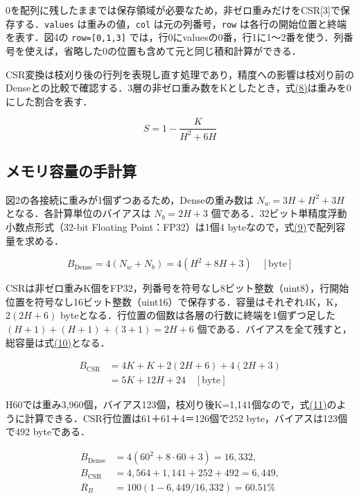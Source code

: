 \documentclass[
  10pt,
  a4paper,
]{article}
\begin{document}
0を配列に残したままでは保存領域が必要なため，非ゼロ重みだけをCSR{[}3{]}で保存する．\texttt{values}
は重みの値，\texttt{col} は元の列番号，\texttt{row}
は各行の開始位置と終端を表す．図4の \texttt{row={[}0,1,3{]}}
では，行0にvaluesの0番，行1に1〜2番を使う．列番号を使えば，省略した0の位置も含めて元と同じ積和計算ができる．

CSR変換は枝刈り後の行列を表現し直す処理であり，精度への影響は枝刈り前のDenseとの比較で確認する．3層の非ゼロ重み数をKとしたとき，式\hyperref[eq:sparsity]{(8)}は重みを0にした割合を表す．

\begin{equation}\label{eq:sparsity}
S=1-\frac{K}{H^2+6H}
\end{equation}

\subsection{メモリ容量の手計算}\label{ux30e1ux30e2ux30eaux5bb9ux91cfux306eux624bux8a08ux7b97}

図2の各接続に重みが1個ずつあるため，Denseの重み数は \(N_w=3H+H^2+3H\)
となる．各計算単位のバイアスは \(N_b=2H+3\)
個である．32ビット単精度浮動小数点形式（32-bit Floating
Point：FP32）は1個4
byteなので，式\hyperref[eq:dense-bytes]{(9)}で配列容量を求める．

\begin{equation}\label{eq:dense-bytes}
B_{\mathrm{Dense}}=4(N_w+N_b)=4(H^2+8H+3)\quad[\mathrm{byte}]
\end{equation}

CSRは非ゼロ重みK個をFP32，列番号を符号なし8ビット整数（uint8），行開始位置を符号なし16ビット整数（uint16）で保存する．容量はそれぞれ4K，K，\(2(2H+6)\)
byteとなる．行位置の個数は各層の行数に終端を1個ずつ足した
\((H+1)+(H+1)+(3+1)=2H+6\)
個である．バイアスを全て残すと，総容量は式\hyperref[eq:csr-bytes]{(10)}となる．

\begin{equation}\label{eq:csr-bytes}
\begin{aligned}
B_{\mathrm{CSR}}&=4K+K+2(2H+6)+4(2H+3)\\
&=5K+12H+24\quad[\mathrm{byte}]
\end{aligned}
\end{equation}

H60では重み3,960個，バイアス123個，枝刈り後K=1,141個なので，式\hyperref[eq:h60-capacity]{(11)}のように計算できる．CSR行位置は61＋61＋4＝126個で252
byte，バイアスは123個で492 byteである．

\begin{equation}\label{eq:h60-capacity}
\begin{aligned}
B_{\mathrm{Dense}}&=4(60^2+8\cdot60+3)=16,332,\\
B_{\mathrm{CSR}}&=4,564+1,141+252+492=6,449,\\
R_B&=100(1-6,449/16,332)=60.51\%
\end{aligned}
\end{equation}
\end{document}

